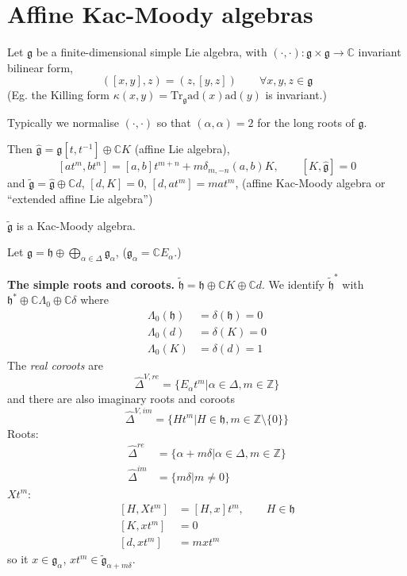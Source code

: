 \section{Affine Kac-Moody algebras}
\label{section-affine-Kac-Moody-algebras}

Let $\mathfrak{g}$ be a finite-dimensional
simple Lie algebra,
with $(\cdot,\cdot):\mathfrak{g} \times
\mathfrak{g} \to \mathbb{C}$
invariant bilinear form,
$$
([x,y],z)=(z,[y,z])\qquad \forall x,y,z \in
\mathfrak{g}
$$
(Eg. the Killing form
$\kappa(x,y)=\text{Tr}_\mathfrak{g}\text{ad}
(x)\text{ad}(y)$
is invariant.)

Typically we normalise $(\cdot,\cdot)$ so
that $(\alpha,\alpha)=2$ for the long
roots of $\mathfrak{g}$.

Then
$\hat{\mathfrak{g}}=\mathfrak{g}[t,t^{-1}]
\oplus\mathbb{C}K$
(affine Lie algebra),
$$
[at^m,bt^n]=[a,b]t^{m+n}+m\delta_{m,-n}(a,b)
K,\qquad
[K,\hat{\mathfrak{g}}]=0
$$
and
$\tilde{\mathfrak{g}}=\hat{\mathfrak{g}}
\oplus\mathbb{C}d$,
$[d,K]=0$,  $[d,at^m]=mat^m$,
(affine Kac-Moody algebra or ``extended
affine Lie algebra'')

\begin{theorem}
\label{theorem-gtilde-is-a-Kac-Moody-algebra}
$\tilde{\mathfrak{g}}$ is a Kac-Moody
algebra.
\end{theorem}

Let $\mathfrak{g}=\mathfrak{h}\oplus
\bigoplus_{\alpha \in
\Delta}\mathfrak{g}_\alpha$,
($\mathfrak{g}_\alpha=\mathbb{C}E_\alpha$.)

{\bf The simple roots and coroots.}
$\tilde{\mathfrak{h}}=\mathfrak{h}
\oplus\mathbb{C}K\oplus\mathbb{C}d$.
We identify $\tilde{\mathfrak{h}}^*$ with
 $\mathfrak{h}^*\oplus\mathbb{C}
 \Lambda_0\oplus\mathbb{C}\delta$
 where
$$
\begin{aligned}
\Lambda_0(\mathfrak{h})&=\delta(\mathfrak{h})
=0\\
\Lambda_0(d)&=\delta(K)=0\\
\Lambda_0(K)&=\delta(d)=1
\end{aligned}
$$
The {\it real coroots} are
$$
\hat{\Delta}^{V,re}=\{E_\alpha t^m|\alpha \in
\Delta, m \in \mathbb{Z}\}
$$
and there are also imaginary roots and
coroots
$$
\hat{\Delta}^{V,im}=\{Ht^m|H \in
\mathfrak{h}, m \in
\mathbb{Z}\setminus\{0\}\}
$$
Roots:
$$
\begin{aligned}
\hat{\Delta}^{re}&=\{\alpha+m\delta|\alpha
\in \Delta, m \in \mathbb{Z}\}\\
\hat{\Delta}^{im}&=\{m\delta|m \neq 0\}
\end{aligned}
$$
$Xt^m$:
$$
\begin{aligned}
[H,Xt^m]&=[H,x]t^m,\qquad H \in
\mathfrak{h}\\
[K,xt^m]&=0\\
[d,xt^m]&=m x t^m
\end{aligned}
$$
so it $x \in \mathfrak{g}_\alpha$, $x t^m \in
\tilde{\mathfrak{g}}_{\alpha+m\delta}$.

